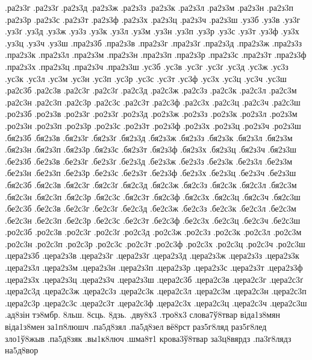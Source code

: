 {.ра2з3г
.ра2з3ґ
.ра2з3д
.ра2з3ж
.ра2з3з
.ра2з3к
.ра2з3л
.ра2з3м
.ра2з3н
.ра2з3п
.ра2з3р
.ра2з3с
.ра2з3т
.ра2з3ф
.ра2з3х
.ра2з3ц
.ра2з3ч
.ра2з3ш
.уз3б
.уз3в
.уз3г
.уз3ґ
.уз3д
.уз3ж
.уз3з
.уз3к
.уз3л
.уз3м
.уз3н
.уз3п
.уз3р
.уз3с
.уз3т
.уз3ф
.уз3х
.уз3ц
.уз3ч
.уз3ш
.пра2з3б
.пра2з3в
.пра2з3г
.пра2з3ґ
.пра2з3д
.пра2з3ж
.пра2з3з
.пра2з3к
.пра2з3л
.пра2з3м
.пра2з3н
.пра2з3п
.пра2з3р
.пра2з3с
.пра2з3т
.пра2з3ф
.пра2з3х
.пра2з3ц
.пра2з3ч
.пра2з3ш
.ус3б
.ус3в
.ус3г
.ус3ґ
.ус3д
.ус3ж
.ус3з
.ус3к
.ус3л
.ус3м
.ус3н
.ус3п
.ус3р
.ус3с
.ус3т
.ус3ф
.ус3х
.ус3ц
.ус3ч
.ус3ш
.ра2с3б
.ра2с3в
.ра2с3г
.ра2с3ґ
.ра2с3д
.ра2с3ж
.ра2с3з
.ра2с3к
.ра2с3л
.ра2с3м
.ра2с3н
.ра2с3п
.ра2с3р
.ра2с3с
.ра2с3т
.ра2с3ф
.ра2с3х
.ра2с3ц
.ра2с3ч
.ра2с3ш
.ро2з3б
.ро2з3в
.ро2з3г
.ро2з3ґ
.ро2з3д
.ро2з3ж
.ро2з3з
.ро2з3к
.ро2з3л
.ро2з3м
.ро2з3н
.ро2з3п
.ро2з3р
.ро2з3с
.ро2з3т
.ро2з3ф
.ро2з3х
.ро2з3ц
.ро2з3ч
.ро2з3ш
.бя2з3б
.бя2з3в
.бя2з3г
.бя2з3ґ
.бя2з3д
.бя2з3ж
.бя2з3з
.бя2з3к
.бя2з3л
.бя2з3м
.бя2з3н
.бя2з3п
.бя2з3р
.бя2з3с
.бя2з3т
.бя2з3ф
.бя2з3х
.бя2з3ц
.бя2з3ч
.бя2з3ш
.бе2з3б
.бе2з3в
.бе2з3г
.бе2з3ґ
.бе2з3д
.бе2з3ж
.бе2з3з
.бе2з3к
.бе2з3л
.бе2з3м
.бе2з3н
.бе2з3п
.бе2з3р
.бе2з3с
.бе2з3т
.бе2з3ф
.бе2з3х
.бе2з3ц
.бе2з3ч
.бе2з3ш
.бя2с3б
.бя2с3в
.бя2с3г
.бя2с3ґ
.бя2с3д
.бя2с3ж
.бя2с3з
.бя2с3к
.бя2с3л
.бя2с3м
.бя2с3н
.бя2с3п
.бя2с3р
.бя2с3с
.бя2с3т
.бя2с3ф
.бя2с3х
.бя2с3ц
.бя2с3ч
.бя2с3ш
.бе2с3б
.бе2с3в
.бе2с3г
.бе2с3ґ
.бе2с3д
.бе2с3ж
.бе2с3з
.бе2с3к
.бе2с3л
.бе2с3м
.бе2с3н
.бе2с3п
.бе2с3р
.бе2с3с
.бе2с3т
.бе2с3ф
.бе2с3х
.бе2с3ц
.бе2с3ч
.бе2с3ш
.ро2с3б
.ро2с3в
.ро2с3г
.ро2с3ґ
.ро2с3д
.ро2с3ж
.ро2с3з
.ро2с3к
.ро2с3л
.ро2с3м
.ро2с3н
.ро2с3п
.ро2с3р
.ро2с3с
.ро2с3т
.ро2с3ф
.ро2с3х
.ро2с3ц
.ро2с3ч
.ро2с3ш
.цера2з3б
.цера2з3в
.цера2з3г
.цера2з3ґ
.цера2з3д
.цера2з3ж
.цера2з3з
.цера2з3к
.цера2з3л
.цера2з3м
.цера2з3н
.цера2з3п
.цера2з3р
.цера2з3с
.цера2з3т
.цера2з3ф
.цера2з3х
.цера2з3ц
.цера2з3ч
.цера2з3ш
.цера2с3б
.цера2с3в
.цера2с3г
.цера2с3ґ
.цера2с3д
.цера2с3ж
.цера2с3з
.цера2с3к
.цера2с3л
.цера2с3м
.цера2с3н
.цера2с3п
.цера2с3р
.цера2с3с
.цера2с3т
.цера2с3ф
.цера2с3х
.цера2с3ц
.цера2с3ч
.цера2с3ш
.ад8зін
тэ8мбр.
8льш.
8сць.
8дзь.
.дву8х3
.тро8х3
слова7ў8твар
віда1з8мян
віда1з8мен
за1п8люшч
.па5д8зял
.па5д8зел
вё8рст
раз5г8ляд
раз5г8лед
зло1ў8жыв
.па5д8зяк
.вы1к8люч
.шма8т1
крова3ў8твар
за3ц8вярдз
.па3г8лядз
на5д8вор
}

